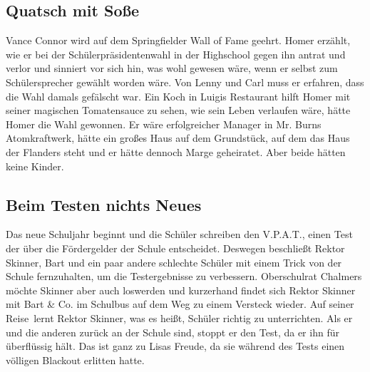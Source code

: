 
\subsection{Quatsch mit Soße}\label{LABF01}
Vance Connor wird auf dem Springfielder Wall of Fame geehrt. Homer erzählt, wie er bei der Schülerpräsidentenwahl in der Highschool gegen ihn antrat und verlor und sinniert vor sich hin, was wohl gewesen wäre, wenn er selbst zum Schülersprecher gewählt worden wäre. Von Lenny und Carl muss er erfahren, dass die Wahl damals gefälscht war. Ein Koch in Luigis Restaurant hilft Homer mit seiner magischen Tomatensauce zu sehen, wie sein Leben verlaufen wäre, hätte Homer die Wahl gewonnen. Er wäre erfolgreicher Manager in Mr. Burns Atomkraftwerk, hätte ein großes Haus auf dem Grundstück, auf dem das Haus der Flanders steht und er hätte dennoch Marge geheiratet. Aber beide hätten keine Kinder. 


\subsection{Beim Testen nichts Neues}\label{LABF02}
Das neue Schuljahr beginnt und die Schüler schreiben den V.P.A.T., einen Test der über die Fördergelder der Schule entscheidet. Deswegen beschließt Rektor Skinner, Bart und ein paar andere schlechte Schüler mit einem Trick von der Schule fernzuhalten, um die Testergebnisse zu verbessern. Oberschulrat Chalmers möchte Skinner aber auch loswerden und kurzerhand findet sich Rektor Skinner mit Bart \& Co. im Schulbus auf dem Weg zu einem Versteck wieder. Auf seiner \glqq Reise\grqq\ lernt Rektor Skinner, was es heißt, Schüler richtig zu unterrichten. Als er und die anderen zurück an der Schule sind, stoppt er den Test, da er ihn für überflüssig hält. Das ist ganz zu Lisas Freude, da sie während des Tests einen völligen Blackout erlitten hatte. 

